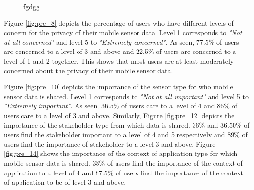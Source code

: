 \begin{figure}[htp]
\caption{fgdgg}
\label{fig:st3}
\end{figure}

Figure \ref{fig:pre_8} depicts the percentage of users who have different levels of concern for the privacy of their mobile sensor data. Level 1 corresponds to \textit{"Not at all concerned"} and level 5 to \textit{"Extremely concerned"}. As seen, 77.5\% of users are concerned to a level of 3 and above and 22.5\% of users are concerned to a level of 1 and 2 together. This shows that most users are at least moderately concerned about the privacy of their mobile sensor data.

Figure \ref{fig:pre_10} depicts the importance of the sensor type for who mobile sensor data is shared. Level 1 corresponds to \textit{"Not at all important"} and level 5 to \textit{"Extremely important"}. As seen, 36.5\% of users care to a level of 4 and 86\% of users care to a level of 3 and above. Similarly, Figure \ref{fig:pre_12} depicts the importance of the stakeholder type from which data is shared. 36\% and 36.50\% of users find the stakeholder important to a level of 4 and 5 respectively and 89\% of users find the importance of stakeholder to a level 3 and above. Figure \ref{fig:pre_14} shows the importance of the context of application type for which mobile sensor data is shared. 38\% of users find the importance of the context of application to a level of 4 and 87.5\% of users find the importance of the context of application to be of level 3 and above.

